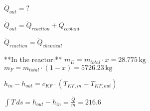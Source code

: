 \( \dot{Q}_{out} = ? \)  

\( \dot{Q}_{out} = \dot{Q}_{reaction} + \dot{Q}_{coolant} \)  

\( \dot{Q}_{reaction} = \dot{Q}_{chemical} \)  

**In the reactor:**  
\( m_D = m_{total} \cdot x = 28.775 \, \text{kg} \)  
\( m_F = m_{total} \cdot (1 - x) = 5726.23 \, \text{kg} \)  

\( h_{in} - h_{out} = c_{KF} \cdot (T_{KF,in} - T_{KF,out}) \)  

\( \int T \, ds = h_{out} - h_{in} = \frac{\dot{Q}}{\dot{m}} = 216.6 \)